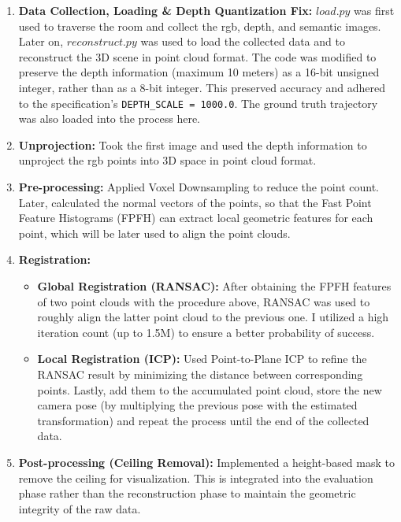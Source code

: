 \documentclass{article}
\begin{document}
\begin{enumerate}
    \item \textbf{Data Collection, Loading \& Depth Quantization Fix:} 
    $load.py$ was first used to traverse the room and collect the rgb, depth, and semantic images.
    Later on, $reconstruct.py$ was used to load the collected data and to reconstruct the 3D scene in point cloud format. 
    The code was modified to preserve the depth information (maximum 10 meters) as a 16-bit unsigned integer, rather than 
    as a 8-bit integer. This preserved accuracy and adhered to the specification's \texttt{DEPTH\_SCALE = 1000.0}. 
    The ground truth trajectory was also loaded into the process here.

    \item \textbf{Unprojection:}
    Took the first image and used the depth information to unproject the rgb points into 3D space in point cloud format. 

    \item \textbf{Pre-processing:}
    Applied Voxel Downsampling to reduce the point count. Later, calculated the normal vectors of the 
    points, so that the Fast Point Feature Histograms (FPFH) can extract local geometric features for 
    each point, which will be later used to align the point clouds.

    \item \textbf{Registration:}
    \begin{itemize}
        \item \textbf{Global Registration (RANSAC):}
        After obtaining the FPFH features of two point clouds with the procedure above, RANSAC was used to roughly align the latter point cloud to the previous one.
        I utilized a high iteration count (up to 1.5M) to ensure a better probability of success.
        \item \textbf{Local Registration (ICP):}
        Used Point-to-Plane ICP to refine the RANSAC result by minimizing the distance between corresponding points. 
        Lastly, add them to the accumulated point cloud, store the new camera pose (by multiplying the previous pose with the estimated transformation) and 
        repeat the process until the end of the collected data.
    \end{itemize}

    \item \textbf{Post-processing (Ceiling Removal):}
    Implemented a height-based mask to remove the ceiling for visualization. 
    This is integrated into the evaluation phase rather than the reconstruction phase to maintain the geometric integrity of the raw data.
\end{enumerate}
\end{document}
